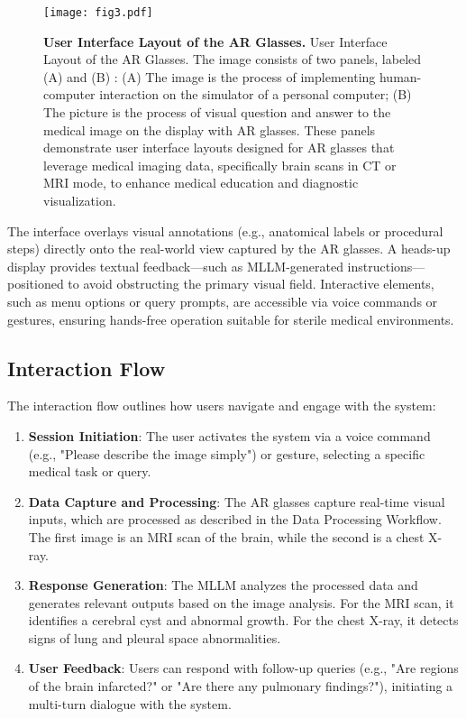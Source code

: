 \documentclass[10pt,letterpaper]{article}
\begin{document}
\begin{figure}[ht]
\centering
\texttt{[image: fig3.pdf]}
\caption{{\bf User Interface Layout of the AR Glasses.} 
User Interface Layout of the AR Glasses. The image consists of two panels, labeled (A) and (B) : (A) The image is the process of implementing human-computer interaction on the simulator of a personal computer; (B) The picture is the process of visual question and answer to the medical image on the display with AR glasses. These panels demonstrate user interface layouts designed for AR glasses that leverage medical imaging data, specifically brain scans in CT or MRI mode, to enhance medical education and diagnostic visualization.}
\label{fig:ui}
\end{figure}


The interface overlays visual annotations (e.g., anatomical labels or procedural steps) directly onto the real-world view captured by the AR glasses. A heads-up display provides textual feedback—such as MLLM-generated instructions—positioned to avoid obstructing the primary visual field. Interactive elements, such as menu options or query prompts, are accessible via voice commands or gestures, ensuring hands-free operation suitable for sterile medical environments.

\subsection*{Interaction Flow}

The interaction flow outlines how users navigate and engage with the system:
\begin{enumerate} 
  \item{\textbf{Session Initiation}: The user activates the system via a voice command (e.g., "Please describe the image simply") or gesture, selecting a specific medical task or query.}
  \item{\textbf{Data Capture and Processing}: The AR glasses capture real-time visual inputs, which are processed as described in the Data Processing Workflow. The first image is an MRI scan of the brain, while the second is a chest X-ray.}
  \item{\textbf{Response Generation}: The MLLM analyzes the processed data and generates relevant outputs based on the image analysis. For the MRI scan, it identifies a cerebral cyst and abnormal growth. For the chest X-ray, it detects signs of lung and pleural space abnormalities.}
  \item{\textbf{User Feedback}: Users can respond with follow-up queries (e.g., "Are regions of the brain infarcted?" or "Are there any pulmonary findings?"), initiating a multi-turn dialogue with the system.}
\end{enumerate}
\end{document}
